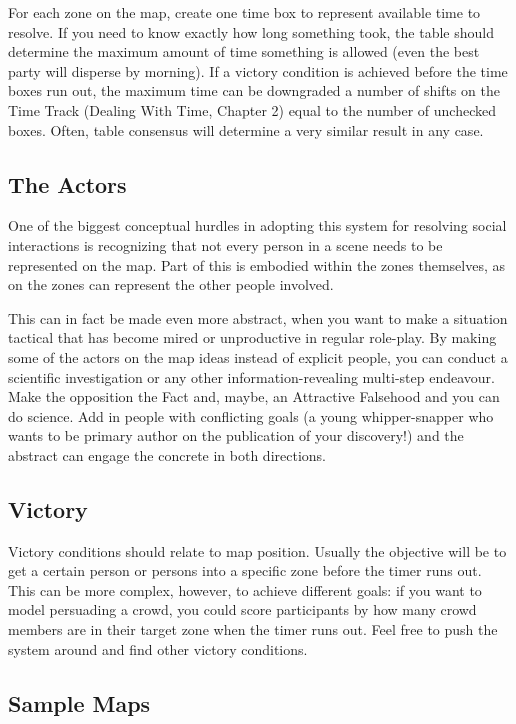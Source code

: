 For each zone on the map, create one time box to represent available time to resolve. If you need to know exactly how long something took, the table should determine the maximum amount of time something is allowed (even the best party will disperse by morning). If a victory condition is achieved before the time boxes run out, the maximum time can be downgraded a number of shifts on the Time Track (Dealing With Time, Chapter 2) equal to the number of unchecked boxes. Often, table consensus will determine a very similar result in any case.

\subsection{The Actors}\label{sec:The Actors}

One of the biggest conceptual hurdles in adopting this system for resolving social interactions is recognizing that not every person in a scene needs to be represented on the map. Part of this is embodied within the zones themselves, as \Aspects{} on the zones can represent the other people involved.

This can in fact be made even more abstract, when you want to make a situation tactical that has become mired or unproductive in regular role-play. By making some of the actors on the map ideas instead of explicit people, you can conduct a scientific investigation or any other information-revealing multi-step endeavour. Make the opposition the Fact and, maybe, an Attractive Falsehood and you can do science. Add in people with conflicting goals (a young whipper-snapper who wants to be primary author on the publication of your discovery!) and the abstract can engage the concrete in both directions.

\subsection{Victory}\label{sec:Victory}

Victory conditions should relate to map position. Usually the objective will be to get a certain person or persons into a specific zone before the timer runs out. This can be more complex, however, to achieve different goals: if you want to model persuading a crowd, you could score participants by how many crowd members are in their target zone when the timer runs out. Feel free to push the system around and find other victory conditions.

\subsection{Sample Maps}\label{sec:Sample Maps}

